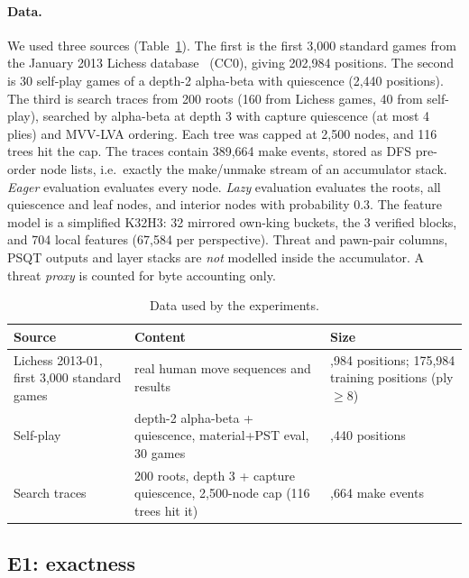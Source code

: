 \paragraph{Data.}
We used three sources (Table~\ref{tab:data}).
The first is the first 3,000 standard games from the January 2013 Lichess database~\cite{lichessdb} (CC0), giving 202,984 positions.
The second is 30 self-play games of a depth-2 alpha-beta with quiescence (2,440 positions).
The third is search traces from 200 roots (160 from Lichess games, 40 from self-play), searched by alpha-beta at depth 3 with capture quiescence (at most 4 plies) and MVV-LVA ordering.
Each tree was capped at 2,500 nodes, and 116 trees hit the cap.
The traces contain 389,664 make events, stored as DFS pre-order node lists, i.e.\ exactly the make/unmake stream of an accumulator stack.
\emph{Eager} evaluation evaluates every node.
\emph{Lazy} evaluation evaluates the roots, all quiescence and leaf nodes, and interior nodes with probability 0.3.
The feature model is a simplified K32H3: 32 mirrored own-king buckets, the 3 verified blocks, and 704 local features (67,584 per perspective).
Threat and pawn-pair columns, PSQT outputs and layer stacks are \emph{not} modelled inside the accumulator.
A threat \emph{proxy} is counted for byte accounting only.

\begin{table}[htbp]
\centering\small
\caption{Data used by the experiments.}\label{tab:data}
\begin{tabularx}{\linewidth}{@{}>{\raggedright}p{3.6cm}>{\raggedright}X>{\raggedright\arraybackslash}p{3.8cm}@{}}
\toprule
Source & Content & Size\\
\midrule
Lichess 2013-01, first 3,000 standard games & real human move sequences and results & 202,984 positions; 175,984 training positions (ply $\ge8$)\\
Self-play & depth-2 alpha-beta + quiescence, material+PST eval, 30 games & 2,440 positions\\
Search traces & 200 roots, depth 3 + capture quiescence, 2,500-node cap (116 trees hit it) & 389,664 make events\\
\bottomrule
\end{tabularx}
\end{table}

\subsection{E1: exactness}\label{sec:e1}

